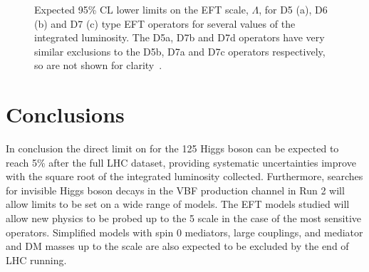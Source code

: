 \begin{figure}
  \caption{Expected 95\% \ac{CL} lower limits on the \ac{EFT} scale, $\Lambda$, for D5 (a), D6 (b) and D7 (c) type \ac{EFT} operators for several values of the integrated luminosity. The D5a, D7b and D7d operators have very similar exclusions to the D5b, D7a and D7c operators respectively, so are not shown for clarity~\cite{ourdmpaper}.}
  \label{fig:eftlimits}
\end{figure}

\section{Conclusions}
\label{sec:dmconclusions}
In conclusion the direct limit on \BRinv for the 125 \GeV Higgs boson can be expected to reach 5\% after the full LHC dataset, providing systematic uncertainties improve with the square root of the integrated luminosity collected. Furthermore, searches for invisible Higgs boson decays in the \ac{VBF} production channel in Run 2 will allow limits to be set on a wide range of models. The \ac{EFT} models studied will allow new physics to be probed up to the 5 \TeV scale in the case of the most sensitive operators. Simplified models with spin 0 mediators, large couplings, and mediator and \ac{DM} masses  up to the \TeV scale are also expected to be excluded by the end of LHC running.

